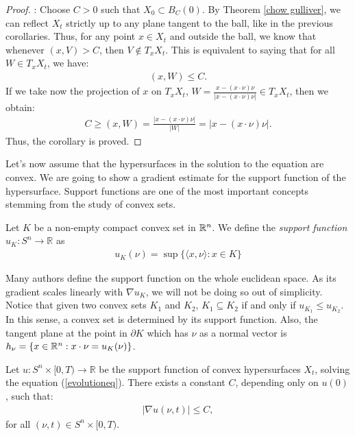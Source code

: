 \begin{proof}: 
	Choose $ C > 0 $ such that $ X_0 \subset B_C(0) $. By Theorem \ref{chow gulliver}, we can reflect $ X_t $ strictly up to any plane tangent to the ball, like in the previous corollaries.	
	Thus, for any point $ x \in X_t $ and outside the ball, we know that whenever $ (x, V) > C $, then $ V \notin T_x X_t $.
	This is equivalent to saying that for all $ W \in T_x X_t $, we have:
	\begin{align*}
		(x, W) \leq C.
	\end{align*}
	If we take now the projection of $x$ on $T_x X_t$, $ W = \frac{x - (x \cdot \nu) \nu}{|x - (x \cdot \nu) \nu|} \in T_x X_t $, then we obtain:
	\begin{align*}
		C \geq (x, W) = \frac{|x - (x \cdot \nu) \nu|}{|W|} = |x - (x \cdot \nu) \nu|.
	\end{align*}	
	Thus, the corollary is proved.
\end{proof}

Let's now assume that the hypersurfaces in the solution to the equation are convex. We are going to show a gradient estimate for the support function of the hypersurface. Support functions are one of the most important concepts stemming from the study of convex sets. 
\begin{defin}
	Let $K$ be a non-empty compact convex set in $\mathbb{R}^n$. We define the {\em support function} $u_K:  S^n \to \mathbb{R} $ as 
	\begin{align*}
		u_K (\nu) = \sup\{\langle x, \nu \rangle : x\in K \}
	\end{align*}
\end{defin}

\begin{oss}
	Many authors define the support function on the whole euclidean space. As its gradient scales linearly with $\nabla u_K$, we will not be doing so out of simplicity. Notice that given two convex sets $K_1$ and $K_2$, $K_1 \subseteq K_2$ if and only if   $u_{K_1} \leq u_{K_2}$. In this sense, a convex set is determined by its support function. Also, the tangent plane at the point in $\partial K$ which has $\nu$ as a normal vector is  $h_\nu=\{x\in \mathbb{R}^n : x \cdot \nu = u_K (\nu)\}$. 
\end{oss}

\begin{cor}
	Let $ u : S^n \times [0, T) \to \mathbb{R} $ be the support function of convex hypersurfaces $ X_t $, solving the equation  (\ref{evolutioneq}). There exists a constant $ C $, depending only on $ u(0) $, such that:
	\begin{align*}
		|\nabla u(\nu, t)| \leq C,
	\end{align*}
	for all $ (\nu, t) \in S^n \times [0, T)$.
\end{cor}



